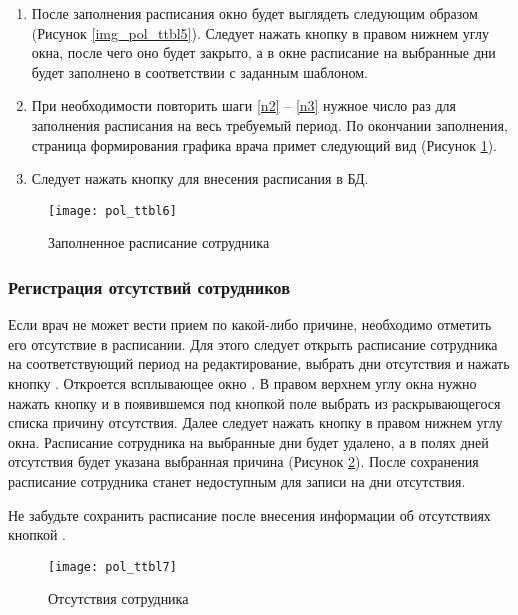 {\begin{enumerate}
 \item \label{n3} После заполнения расписания окно будет выглядеть следующим образом (Рисунок \ref{img_pol_ttbl5}). Следует нажать кнопку  в правом нижнем углу окна, после чего оно будет закрыто, а в окне  расписание на выбранные дни будет заполнено в соответствии с заданным шаблоном. 
 \item При необходимости повторить шаги \ref{n2} -- \ref{n3} нужное число раз для заполнения расписания на весь требуемый период. По окончании заполнения, страница формирования графика врача примет следующий вид (Рисунок \ref{img_pol_ttbl6}). 
 \item Следует нажать кнопку  для внесения расписания в БД. 
\end{enumerate}

\begin{figure}[ht]\centering
 \texttt{[image: pol\_ttbl6]}
 \caption{Заполненное расписание сотрудника}
 \label{img_pol_ttbl6}
\end{figure}

\subsubsection{Регистрация отсутствий сотрудников}

Если врач не может вести прием по какой-либо причине, необходимо отметить его отсутствие в расписании. Для этого следует открыть расписание сотрудника на соответствующий период на редактирование, выбрать дни отсутствия и нажать кнопку . Откроется всплывающее окно . В правом верхнем углу окна нужно нажать кнопку  и в появившемся под кнопкой поле выбрать из раскрывающегося списка причину отсутствия. Далее следует нажать кнопку  в правом нижнем углу окна. Расписание сотрудника на выбранные дни будет удалено, а в полях дней отсутствия будет указана выбранная причина (Рисунок \ref{img_pol_ttbl7}). После сохранения  расписание сотрудника станет недоступным для записи на дни отсутствия.

\begin{vnim}
 Не забудьте сохранить расписание после внесения информации об отсутствиях кнопкой .
\end{vnim} 

\begin{figure}[ht]\centering
 \texttt{[image: pol\_ttbl7]}
 \caption{Отсутствия сотрудника}
 \label{img_pol_ttbl7}
\end{figure}

}
